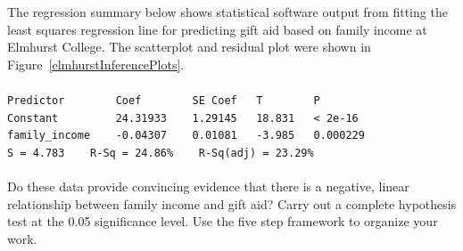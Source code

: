 \begin{examplewrap}
\begin{nexample}{
The regression summary below shows statistical software output from fitting the least squares regression line for predicting gift aid based on family income at Elmhurst College.  The scatterplot and residual plot were shown in Figure~\ref{elmhurstInferencePlots}. 
\\
\\
\texttt{Predictor \ \ \ \ \ \ \ Coef \ \ \ \ \ \ \ SE Coef \ \ T \ \ \ \ \ \ \ P} \\
\texttt{Constant \ \ \ \ \ \ \ \  24.31933 \ \ \ 1.29145 \ \ 18.831 \ \ < 2e-16} \\
\texttt{family\_income\ \ \ \ -0.04307 \ \ \ 0.01081 \ \ -3.985 \ \ 0.000229} \\

\texttt{S = 4.783\ \ \ \ R-Sq = 24.86\% \ \ \ R-Sq(adj) = 23.29\%}
\\
\\
Do these data provide convincing evidence that there is a negative, linear relationship between family income and gift aid?  Carry out a complete hypothesis test at the 0.05 significance level.  Use the five step framework to organize your work.}


\end{nexample}
\end{examplewrap}
